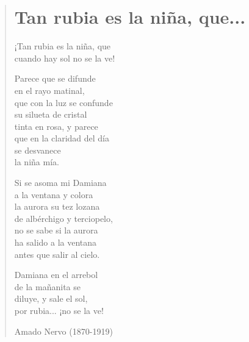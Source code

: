 \documentclass[12pt, twoside]{book}
\begin{document}
\begin{verse}
\begin{center}
\section{Tan rubia es la niña, que...}
\end{center}
¡Tan rubia es la niña, que\\
cuando hay sol no se la ve!\newline

Parece que se difunde\\
en el rayo matinal,\\
que con la luz se confunde\\
su silueta de cristal\\
tinta en rosa, y parece\\
que en la claridad del día\\
se desvanece\\
la niña mía.\newline

Si se asoma mi Damiana\\
a la ventana y colora\\
la aurora su tez lozana\\
de albérchigo y terciopelo,\\
no se sabe si la aurora\\
ha salido a la ventana\\
antes que salir al cielo.\newline

Damiana en el arrebol\\
de la mañanita se\\
diluye, y sale el sol,\\
por rubia... ¡no se la ve!\newline

Amado Nervo (1870-1919)
\end{verse}
\newpage
\end{document}

